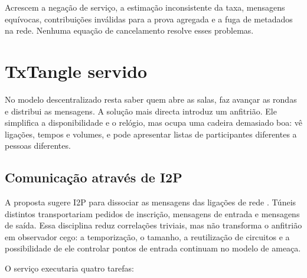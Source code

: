 Acrescem a negação de serviço, a estimação inconsistente da taxa, mensagens
equívocas, contribuições inválidas para a prova agregada e a fuga de metadados
na rede. Nenhuma equação de cancelamento resolve esses problemas.

\section{TxTangle servido}
\label{sec:hosted-txtangle}

No modelo descentralizado resta saber quem abre as salas, faz avançar as
rondas e distribui as mensagens. A solução mais directa introduz um anfitrião.
Ele simplifica a disponibilidade e o relógio, mas ocupa uma cadeira demasiado
boa: vê ligações, tempos e volumes, e pode apresentar listas de participantes
diferentes a pessoas diferentes.

\subsection{Comunicação através de I2P}
\label{subsec:txtangle-host-communication}

A proposta sugere I2P para dissociar as mensagens das ligações de rede
\cite{exa-blockchain-analysis}. Túneis distintos transportariam pedidos de
inscrição, mensagens de entrada e mensagens de saída. Essa disciplina reduz
correlações triviais, mas não transforma o anfitrião em observador cego: a
temporização, o tamanho, a reutilização de circuitos e a possibilidade de ele
controlar pontos de entrada continuam no modelo de ameaça.

O serviço executaria quatro tarefas:

